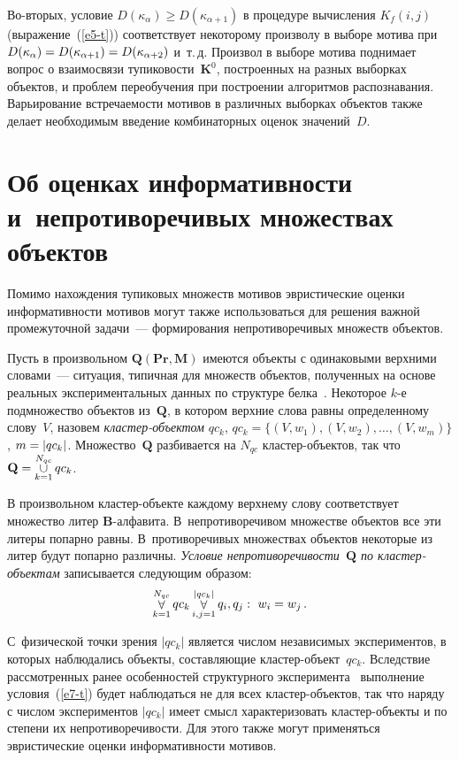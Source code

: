 \begin{multicols}{2}
    Во-вторых, условие $D(\kappa_\alpha)\geq D(\kappa_{\alpha+1})$ в процедуре
вычисления $K_f(i,j)$ (выражение~(\ref{e5-t})) соответствует некоторому
произволу в выборе мотива при
$D(\kappa_\alpha)\hm=D(\kappa_{\alpha+1})\hm=D(\kappa_{\alpha+2})$ и~т.\,д. Произвол в
выборе мотива поднимает вопрос о взаимосвязи тупиковости~$\mathbf{K}^0$,
построенных на разных выборках объектов, и проблем переобучения при
построении алгоритмов распознавания. Варьирование встречаемости
мотивов в различных выборках объектов также делает необходимым
введение комбинаторных оценок значений~$D$.


\section{Об оценках информативности и~непротиворечивых
множествах объектов}

Помимо нахождения тупиковых множеств мотивов эвристические оценки
информативности мо\-ти\-вов могут также использоваться для решения важной
промежуточной задачи~--- формирования непротиворечивых множеств
объектов.

Пусть в произвольном $\mathbf{Q}(\mathbf{Pr}, \mathbf{M})$ имеются объекты с одинаковыми
верхними словами~--- ситуация, типичная для множеств объектов,
полученных на основе реальных экспериментальных данных по структуре
белка~\cite{3-t}. Некоторое $k$-е подмножество объектов из~$\mathbf{Q}$, в котором
верхние слова равны определенному слову~$V$, назовем
\textit{клас\-тер-объек\-том} $qc_k$, $qc_k=\{(V, w_1), (V, w_2), \ldots , (V,
w_m)\}$, $m\hm = \vert qc_k\vert$. Множество~$\mathbf{Q}$ разбивается на $N_{qc}$
клас\-тер-объек\-тов, так что $\mathbf{Q}=\mathop{\cup}\limits_{k=1}^{N_{qc}} qc_k$.

В произвольном кластер-объекте каждому верхнему слову соответствует
множество литер $\mathbf{B}$-ал\-фа\-ви\-та. В~непротиворечивом множестве
объектов все эти литеры попарно равны. В~противоречивых множествах
объектов некоторые из литер будут попарно различны. \textit{Условие
непротиворечивости~$\mathbf{Q}$ по клас\-тер-объек\-там} записывается
следующим образом:
\begin{equation}
\mathop{\forall}\limits_{k=1}^{N_{qc}} qc_k \mathop{\forall}\limits_{i,j=1}^{\vert qc_k\vert}
q_i,q_j:\ w_i=w_j\,.
\label{e7-t}
\end{equation}


С~физической точки зрения $\vert qc_k\vert$ является чис\-лом независимых
экспериментов, в которых\linebreak
 наблюдались объекты, составляющие клас\-тер-объ\-ект~$qc_k$.
Вследствие рассмотренных ранее особенностей структурного
эксперимента~\cite{3-t} выполнение условия~(\ref{e7-t}) будет наблюдаться
не для всех клас\-тер-объ\-ек\-тов, так что наряду с числом экспериментов $\vert
qc_k\vert$ имеет смысл характеризовать кластер-объекты и по степени их
непротиворечивости. Для этого также могут применяться эвристические
оценки информативности мотивов.


\end{multicols}
